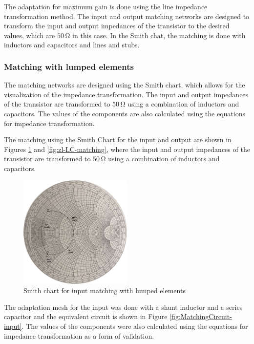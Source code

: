 The adaptation for maximum gain is done using the line impedance transformation method. The input and output matching networks are designed to transform the input and output impedances of the transistor to the desired values, which are $50\,\si{\ohm}$ in this case. In the Smith chat, the matching is done with inductors and capacitors and lines and stubs.

\subsubsection{Matching with lumped elements}

The matching networks are designed using the Smith chart, which allows for the visualization of the impedance transformation. The input and output impedances of the transistor are transformed to $50\,\si{\ohm}$ using a combination of inductors and capacitors. The values of the components are also calculated using the equations for impedance transformation.

The matching using the Smith Chart for the input and output are shown in Figures \ref{fig:zs-LC-matching} and \ref{fig:zl-LC-matching}, where the input and output impedances of the transistor are transformed to $50\,\si{\ohm}$ using a combination of inductors and capacitors.

\begin{figure}[H]
    \centering
    \includegraphics[width=0.5\textwidth]{Images/zs-LC-matching.png}
    \caption{Smith chart for input matching with lumped elements}
    \label{fig:zs-LC-matching}
\end{figure}

The adaptation mesh for the input was done with a shunt inductor and a series capacitor and the equivalent circuit is shown in Figure \ref{fig:MatchingCircuit-input}. The values of the components were also calculated using the equations for impedance transformation as a form of validation.

